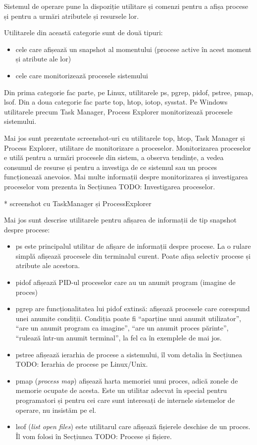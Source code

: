 Sistemul de operare pune la dispoziție utilitare și comenzi pentru a afișa
procese și pentru a urmări atributele și resursele lor.

Utilitarele din această categorie sunt de două tipuri:

\begin{itemize}
	\item cele care afișează un snapshot al momentului (procese active în
		acest moment și atribute ale lor)
	\item cele care monitorizează procesele sistemului
\end{itemize}

Din prima categorie fac parte, pe Linux, utilitarele ps, pgrep, pidof, pstree,
pmap, lsof. Din a doua categorie fac parte top, htop, iotop, sysstat. Pe Windows
utilitarele precum Task Manager, Process Explorer monitorizează procesele
sistemului.

Mai jos sunt prezentate screenshot-uri cu utilitarele top, htop, Task Manager și
Process Explorer, utilitare de monitorizare a proceselor. Monitorizarea
proceselor e utilă pentru a urmări procesele din sistem, a observa tendințe, a
vedea consumul de resurse și pentru a investiga de ce sistemul sau un proces
funcționează anevoios. Mai multe informații despre monitorizarea și investigarea
proceselor vom prezenta în Secțiunea TODO: Investigarea proceselor.

* screenshot cu TaskManager și ProcessExplorer

Mai jos sunt descrise utilitarele pentru afișarea de informații de tip snapshot
despre procese:

\begin{itemize}
	\item ps este principalul utilitar de afișare de informații despre
		procese. La o rulare simplă afișează procesele din terminalul
		curent. Poate afișa selectiv procese și atribute ale acestora.
	\item pidof afișează PID-ul proceselor care au un anumit program
		(imagine de proces)
	\item pgrep are funcționalitatea lui pidof extinsă: afișează procesele
		care corespund unei anumite condiții. Condiția poate fi
		“aparține unui anumit utilizator”, “are un anumit program ca
		imagine”, “are un anumit proces părinte”, “rulează într-un
		anumit terminal”, la fel ca în exemplele de mai jos.
	\item pstree afișează ierarhia de procese a sistemului, îl vom detalia
		în Secțiunea TODO: Ierarhia de procese pe Linux/Unix.
	\item pmap (\textit{process map}) afișează harta memoriei unui proces, adică
		zonele de memorie ocupate de acesta. Este un utilitar adecvat în
		special pentru programatori și pentru cei care sunt interesați
		de internele sistemelor de operare, nu insistăm pe el.
	\item lsof (\textit{list open files}) este utilitarul care afișează fișierele
		deschise de un proces. Îl vom folosi în Secțiunea TODO: Procese
		și fișiere.
\end{itemize}

